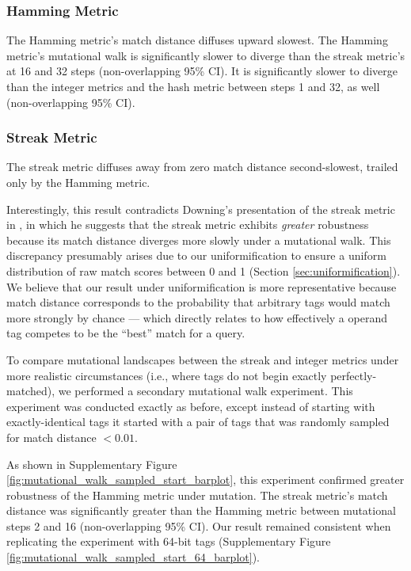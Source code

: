 \subsubsection{Hamming Metric}

The Hamming metric's match distance diffuses upward slowest.
The Hamming metric's mutational walk is significantly slower to diverge than the streak metric's at 16 and 32 steps (non-overlapping 95\% CI).
It is significantly slower to diverge than the integer metrics and the hash metric between steps 1 and 32, as well (non-overlapping 95\% CI).

\subsubsection{Streak Metric}

The streak metric diffuses away from zero match distance second-slowest, trailed only by the Hamming metric.

Interestingly, this result contradicts Downing's presentation of the streak metric in \citep{downing2015intelligence}, in which he suggests that the streak metric exhibits \textit{greater} robustness because its match distance diverges more slowly under a mutational walk.
This discrepancy presumably arises due to our uniformification to ensure a uniform distribution of raw match scores between 0 and 1 (Section \ref{sec:uniformification}).
We believe that our result under uniformification is more representative because match distance corresponds to the probability that arbitrary tags would match more strongly by chance --- which directly relates to how effectively a operand tag competes to be the ``best'' match for a query.

To compare mutational landscapes between the streak and integer metrics under more realistic circumstances (i.e., where tags do not begin exactly perfectly-matched), we performed a secondary mutational walk experiment.
This experiment was conducted exactly as before, except instead of starting with exactly-identical tags it started with a pair of tags that was randomly sampled for match distance $<0.01$.

As shown in Supplementary Figure \ref{fig:mutational_walk_sampled_start_barplot}, this experiment confirmed greater robustness of the Hamming metric under mutation.
The streak metric's match distance was significantly greater than the Hamming metric between mutational steps 2 and 16 (non-overlapping 95\% CI).
Our result remained consistent when replicating the experiment with 64-bit tags (Supplementary Figure \ref{fig:mutational_walk_sampled_start_64_barplot}).
